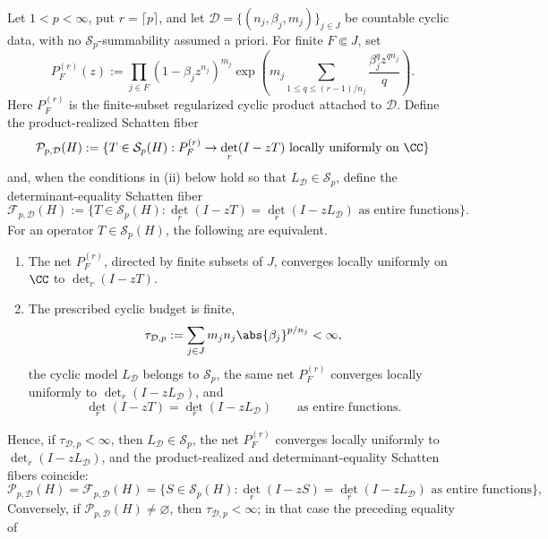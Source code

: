 \begin{proposition}
  \label{prop:schatten-finite-budget-localization}
  Let \(1<p<\infty\), put \(r=\lceil p\rceil\), and let
  \(\mathcal D=\{(n_j,\beta_j,m_j)\}_{j\in J}\) be countable cyclic data, with
  no \(\mathcal S_p\)-summability assumed a priori.  For finite
  \(F\Subset J\), set
  \[
    P_F^{(r)}(z):=
    \prod_{j\in F}
      (1-\beta_jz^{n_j})^{m_j}
      \exp\!\left(
        m_j\sum_{1\le q\le (r-1)/n_j}
          \frac{\beta_j^qz^{qn_j}}{q}
      \right).
  \]
  Here \(P_F^{(r)}\) is the finite-subset regularized cyclic product attached
  to \(\mathcal D\).  Define the product-realized Schatten fiber
  \[
    \mathcal P_{p,\mathcal D}(H)
    :=\{T\in\mathcal S_p(H):
      P_F^{(r)}\to\det_r(I-zT)
      \text{ locally uniformly on }\CC\}
  \]
  and, when the conditions in \textup{(ii)} below hold so that
  \(L_{\mathcal D}\in\mathcal S_p\), define the determinant-equality Schatten
  fiber
  \[
    \mathcal F_{p,\mathcal D}(H)
    :=\{T\in\mathcal S_p(H):
      \det_r(I-zT)=\det_r(I-zL_{\mathcal D})
      \text{ as entire functions}\}.
  \]
  For an operator \(T\in\mathcal S_p(H)\), the following are equivalent.
  \begin{enumerate}[label=\textup{(\roman*)},leftmargin=1.7em]
    \item The net \(P_F^{(r)}\), directed by finite subsets of \(J\), converges
    locally uniformly on \(\CC\) to \(\det_r(I-zT)\).
    \item The prescribed cyclic budget is finite,
    \[
      \tau_{\mathcal D,p}:=
      \sum_{j\in J}m_jn_j\abs{\beta_j}^{p/n_j}<\infty,
    \]
    the cyclic model \(L_{\mathcal D}\) belongs to \(\mathcal S_p\), the same
    net \(P_F^{(r)}\) converges locally uniformly to
    \(\det_r(I-zL_{\mathcal D})\), and
    \[
      \det_r(I-zT)=\det_r(I-zL_{\mathcal D})
      \qquad\text{as entire functions.}
    \]
  \end{enumerate}
  Hence, if \(\tau_{\mathcal D,p}<\infty\), then
  \(L_{\mathcal D}\in\mathcal S_p\), the net \(P_F^{(r)}\) converges locally
  uniformly to \(\det_r(I-zL_{\mathcal D})\), and the product-realized and
  determinant-equality Schatten fibers coincide:
  \[
    \mathcal P_{p,\mathcal D}(H)
    =
    \mathcal F_{p,\mathcal D}(H)
    =
    \{S\in\mathcal S_p(H):
      \det_r(I-zS)=\det_r(I-zL_{\mathcal D})
      \text{ as entire functions}\},
  \]
  Conversely, if \(\mathcal P_{p,\mathcal D}(H)\ne\varnothing\), then
  \(\tau_{\mathcal D,p}<\infty\); in that case the preceding equality of

\end{proposition}
